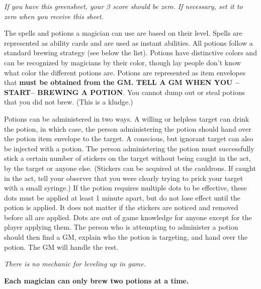 \documentclass[green]{NeptuneBall}
\begin{document}
\name{\gPotions{}}

\emph{If you have this greensheet, your $\beta$ score should be zero. If necessary, set it to zero when you receive this sheet.}

The spells and potions a magician can use are based on their level. Spells are represented as ability cards and are used as instant abilities. All potions follow a standard brewing strategy (see below the list). Potions have distinctive colors and can be recognized by magicians by their color, though lay people don't know what color the different potions are. Potions are represented as item envelopes that {\bf must be obtained from the GM. TELL A GM WHEN YOU --START-- BREWING A POTION}. You cannot dump out or steal potions that you did not brew. (This is a kludge.)

Potions can be administered in two ways. A willing or helpless target can drink the potion, in which case, the person administering the potion should hand over the potion item envelope to the target. A conscious, but ignorant target can also be injected with a potion. The person administering the potion must successfully stick a certain number of stickers on the target without being caught in the act, by the target or anyone else. (Stickers can be acquired at the cauldrons. If caught in the act, tell your observer that you were clearly trying to prick your target with a small syringe.) If the potion requires multiple dots to be effective, these dots must be applied at least 1 minute apart, but do not lose effect until the potion is applied. It does not matter if the stickers are noticed and removed before all are applied. Dots are out of game knowledge for anyone except for the player applying them. The person who is attempting to administer a potion should then find a GM, explain who the potion is targeting, and hand over the potion. The GM will handle the rest.

\emph{There is no mechanic for leveling up in game.}

{\bf Each magician can only brew two potions at a time.} %
\end{document}
